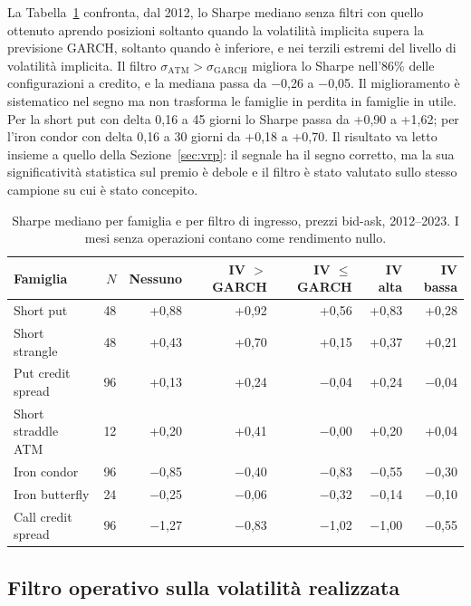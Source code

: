 \documentclass[11pt,a4paper]{article}
\begin{document}
La Tabella~\ref{tab:filt} confronta, dal 2012, lo Sharpe mediano senza filtri con quello ottenuto aprendo posizioni soltanto quando la volatilità implicita supera la previsione GARCH, soltanto quando è inferiore, e nei terzili estremi del livello di volatilità implicita. Il filtro $\sigma_{\mathrm{ATM}}>\sigma_{\mathrm{GARCH}}$ migliora lo Sharpe nell'86\% delle configurazioni a credito, e la mediana passa da $-$0{,}26 a $-$0{,}05. Il miglioramento è sistematico nel segno ma non trasforma le famiglie in perdita in famiglie in utile. Per la short put con delta 0{,}16 a 45 giorni lo Sharpe passa da +0{,}90 a +1{,}62; per l'iron condor con delta 0{,}16 a 30 giorni da +0{,}18 a +0{,}70. Il risultato va letto insieme a quello della Sezione~\ref{sec:vrp}: il segnale ha il segno corretto, ma la sua significatività statistica sul premio è debole e il filtro è stato valutato sullo stesso campione su cui è stato concepito.

\begin{table}[ht]\centering\small
\caption{Sharpe mediano per famiglia e per filtro di ingresso, prezzi bid-ask, 2012--2023. I mesi senza operazioni contano come rendimento nullo.}\label{tab:filt}
\begin{tabular}{lrrrrrr}\toprule
Famiglia & $N$ & Nessuno & IV $>$ GARCH & IV $\le$ GARCH & IV alta & IV bassa \\ \midrule
Short put & 48 & +0{,}88 & +0{,}92 & +0{,}56 & +0{,}83 & +0{,}28 \\
Short strangle & 48 & +0{,}43 & +0{,}70 & +0{,}15 & +0{,}37 & +0{,}21 \\
Put credit spread & 96 & +0{,}13 & +0{,}24 & $-$0{,}04 & +0{,}24 & $-$0{,}04 \\
Short straddle ATM & 12 & +0{,}20 & +0{,}41 & $-$0{,}00 & +0{,}20 & +0{,}04 \\
Iron condor & 96 & $-$0{,}85 & $-$0{,}40 & $-$0{,}83 & $-$0{,}55 & $-$0{,}30 \\
Iron butterfly & 24 & $-$0{,}25 & $-$0{,}06 & $-$0{,}32 & $-$0{,}14 & $-$0{,}10 \\
Call credit spread & 96 & $-$1{,}27 & $-$0{,}83 & $-$1{,}02 & $-$1{,}00 & $-$0{,}55 \\
\bottomrule\end{tabular}\end{table}

\subsection{Filtro operativo sulla volatilità realizzata}\label{sec:fvol}
\end{document}
